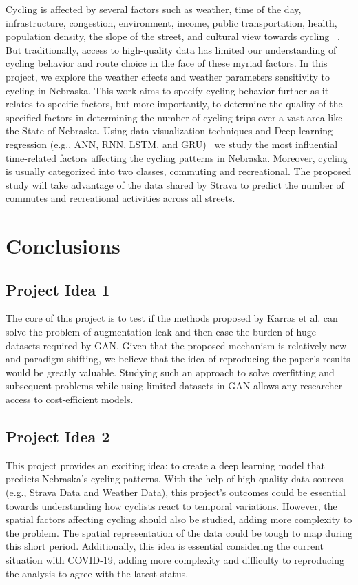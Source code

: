 \documentclass{report}
\begin{document}
Cycling is affected by several factors such as weather, time of the day, infrastructure, congestion, environment, income, public transportation, health, population density, the slope of the street, and cultural view towards cycling ~\cite{musakwa2016mapping, roy2019correcting, hochmair2019estimating}. But traditionally, access to high-quality data has limited our understanding of cycling behavior and route choice in the face of these myriad factors. In this project, we explore the weather effects and weather parameters sensitivity to cycling in Nebraska. This work aims to specify cycling behavior further as it relates to specific factors, but more importantly, to determine the quality of the specified factors in determining the number of cycling trips over a vast area like the State of Nebraska. 
Using data visualization techniques and Deep learning regression (e.g., ANN, RNN, LSTM, and GRU)~\cite{hassoun1995fundamentals, graves2013generating} we study the most influential time-related factors affecting the cycling patterns in Nebraska. Moreover, cycling is usually categorized into two classes, commuting and recreational. The proposed study will take advantage of the data shared by Strava to predict the number of commutes and recreational activities across all streets. 

\section{Conclusions}
\subsection{Project Idea 1}
The core of this project is to test if the methods proposed by Karras et al. can solve the problem of augmentation leak and then ease the burden of huge datasets required by GAN. Given that the proposed mechanism is relatively new and paradigm-shifting, we believe that the idea of reproducing the paper's results would be greatly valuable. Studying such an approach to solve overfitting and subsequent problems while using limited datasets in GAN allows any researcher access to cost-efficient models.

\subsection{Project Idea 2}
This project provides an exciting idea: to create a deep learning model that predicts Nebraska's cycling patterns. With the help of high-quality data sources (e.g., Strava Data and Weather Data), this project's outcomes could be essential towards understanding how cyclists react to temporal variations. However, the spatial factors affecting cycling should also be studied, adding more complexity to the problem. The spatial representation of the data could be tough to map during this short period. Additionally, this idea is essential considering the current situation with COVID-19, adding more complexity and difficulty to reproducing the analysis to agree with the latest status.
\end{document}
